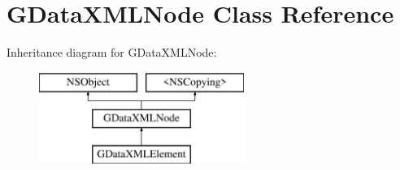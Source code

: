 \hypertarget{interface_g_data_x_m_l_node}{\section{G\+Data\+X\+M\+L\+Node Class Reference}
\label{interface_g_data_x_m_l_node}
}
Inheritance diagram for G\+Data\+X\+M\+L\+Node\+:\begin{figure}[H]
\begin{center}
\leavevmode
\includegraphics[height=3.000000cm]{interface_g_data_x_m_l_node}
\end{center}
\end{figure}
